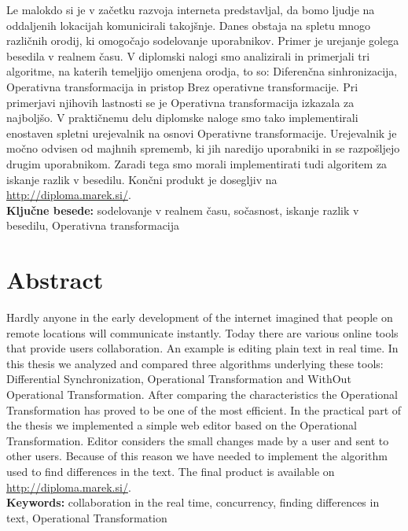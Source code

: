 \documentclass[a4paper, 12pt, twoside]{book}
\newcommand{\clearemptydoublepage}{\newpage{\pagestyle{empty}\cleardoublepage}} %
\begin{document}
Le malokdo si je v začetku razvoja interneta predstavljal, da bomo ljudje na oddaljenih lokacijah komunicirali takojšnje. Danes obstaja na spletu mnogo različnih orodij, ki omogočajo sodelovanje uporabnikov. Primer je urejanje golega besedila v realnem času. V diplomski nalogi smo analizirali in primerjali tri algoritme, na katerih temeljijo omenjena orodja, to so: Diferenčna sinhronizacija, Operativna transformacija in pristop Brez operativne transformacije. Pri primerjavi njihovih lastnosti se je Operativna transformacija izkazala za najboljšo. V praktičnemu delu diplomske naloge smo tako implementirali enostaven spletni urejevalnik na osnovi Operativne transformacije. Urejevalnik je močno odvisen od majhnih sprememb, ki jih naredijo uporabniki in se razpošljejo drugim uporabnikom. Zaradi tega smo morali implementirati tudi algoritem za iskanje razlik v besedilu. Končni produkt je dosegljiv na \url{http://diploma.marek.si/}.\\

\textbf{Ključne besede:} sodelovanje v realnem času, sočasnost, iskanje razlik v besedilu, Operativna transformacija


\clearemptydoublepage

\chapter*{Abstract}
Hardly anyone in the early development of the internet imagined that people on remote locations will communicate instantly. Today there are various online tools that provide users collaboration. An example is editing plain text in real time. In this thesis we analyzed and compared three algorithms underlying these tools: Differential Synchronization, Operational Transformation and WithOut Operational Transformation. After comparing the characteristics the Operational Transformation has proved to be one of the most efficient. In the practical part of the thesis we implemented a simple web editor based on the Operational Transformation. Editor considers the small changes made by a user and sent to other users. Because of this reason we have needed to implement the algorithm used to find differences in the text. The final product is available on \url{http://diploma.marek.si/}.\\

\textbf{Keywords:} collaboration in the real time, concurrency, finding differences in text, Operational Transformation
\end{document}
